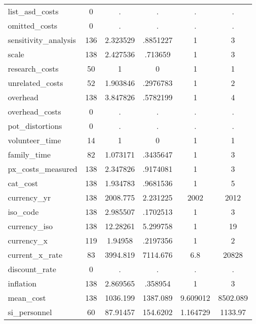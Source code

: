 \begin{table}[htbp]
\begin{tabular}{l*{1}{ccccc}}
list\_asd\_costs&           0&           .&           .&           .&           .\\
omitted\_costs&           0&           .&           .&           .&           .\\
sensitivity\_analysis&         136&    2.323529&    .8851227&           1&           3\\
scale       &         138&    2.427536&     .713659&           1&           3\\
research\_costs&          50&           1&           0&           1&           1\\
unrelated\_costs&          52&    1.903846&    .2976783&           1&           2\\
overhead    &         138&    3.847826&    .5782199&           1&           4\\
overhead\_costs&           0&           .&           .&           .&           .\\
pot\_distortions&           0&           .&           .&           .&           .\\
volunteer\_time&          14&           1&           0&           1&           1\\
family\_time &          82&    1.073171&    .3435647&           1&           3\\
px\_costs\_measured&         138&    2.347826&    .9174081&           1&           3\\
cat\_cost    &         138&    1.934783&    .9681536&           1&           5\\
currency\_yr &         138&    2008.775&    2.231225&        2002&        2012\\
iso\_code    &         138&    2.985507&    .1702513&           1&           3\\
currency\_iso&         138&    12.28261&    5.299758&           1&          19\\
currency\_x  &         119&     1.94958&    .2197356&           1&           2\\
current\_x\_rate&          83&    3994.819&    7114.676&         6.8&       20828\\
discount\_rate&           0&           .&           .&           .&           .\\
inflation   &         138&    2.869565&     .358954&           1&           3\\
mean\_cost   &         138&    1036.199&    1387.089&    9.609012&    8502.089\\
si\_personnel&          60&    87.91457&    154.6202&    1.164729&     1133.97\\

\end{tabular}
\end{table}
